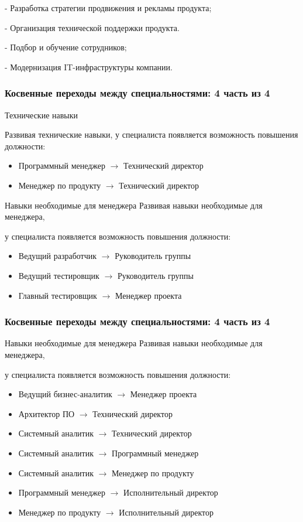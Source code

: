 \documentclass{../industrial-development}
\begin{document}
- Разработка стратегии продвижения и рекламы продукта;

- Организация технической поддержки продукта.

- Подбор и обучение сотрудников;

- Модернизация IT-инфраструктуры компании.

\begin{frame} \frametitle{Косвенные переходы между специальностями: 4 часть из 4}
 \begin{block}{Технические навыки}
 
 Развивая \alert{технические навыки}, у специалиста появляется возможность повышения должности: 
\begin{itemize}
  \item Программный менеджер $\rightarrow$ Технический директор
  \item Менеджер по продукту $\rightarrow$ Технический директор
  \end{itemize}
  \end{block}
\begin{block}{Навыки необходимые для менеджера}
 Развивая \alert{навыки необходимые для менеджера}, 

у специалиста появляется возможность повышения должности: 
\begin{itemize}
  \item Ведущий разработчик $\rightarrow$ Руководитель группы
  \item Ведущий тестировщик $\rightarrow$ Руководитель группы
\item Главный тестировщик $\rightarrow$ Менеджер проекта
  \end{itemize}
  \end{block}
\end{frame}

\begin{frame} \frametitle{Косвенные переходы между специальностями: 4 часть из 4}
 \begin{block}{Навыки необходимые для менеджера}
Развивая \alert{навыки необходимые для менеджера}, 

у специалиста появляется возможность повышения должности: 
\begin{itemize}
 \item Ведущий бизнес-аналитик $\rightarrow$ Менеджер проекта
  \item Архитектор ПО  $\rightarrow$ Технический директор
\item  Системный аналитик $\rightarrow$ Технический директор
 \item Системный аналитик $\rightarrow$ Программный менеджер
 \item Системный аналитик $\rightarrow$ Менеджер по продукту
\item  Программный менеджер $\rightarrow$ Исполнительный директор
\item Менеджер по продукту  $\rightarrow$ Исполнительный директор
  \end{itemize}
  \end{block}

\end{frame}
\end{document}
